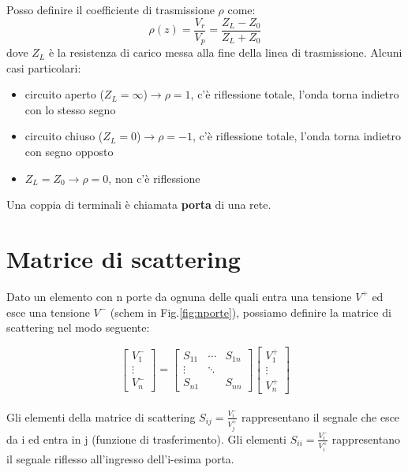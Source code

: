 \documentclass{article}
\begin{document}
Posso definire il coefficiente di trasmissione $\rho$ come:
\begin{equation*}
    \rho (z) = \frac{V_r}{V_p} = \frac{Z_L - Z_0}{Z_L + Z_0}
\end{equation*}
dove $Z_L$ è la resistenza di carico messa alla fine della linea di trasmissione.
Alcuni casi particolari:
\begin{itemize}
    \item circuito aperto ($Z_L = \infty$)$\rightarrow \rho = 1$, 
    c'è riflessione totale, l'onda torna indietro con lo stesso segno
    \item circuito chiuso ($Z_L = 0$)$\rightarrow \rho = -1$, 
    c'è riflessione totale, l'onda torna indietro con segno opposto
    \item $Z_L = Z_0 \rightarrow \rho = 0$, non c'è riflessione
\end{itemize}

Una coppia di terminali è chiamata \textbf{porta} di una rete.

\section{Matrice di scattering}
Dato un elemento con n porte da ognuna delle quali entra una tensione $V^+$ ed esce una tensione $V^-$
(schem in Fig.\ref{fig:nporte}), 
possiamo definire la matrice di scattering nel modo seguente:

\begin{equation*}
    \begin{bmatrix} 
        V^-_{1} \\
        \vdots \\
        V^-_{n}
    \end{bmatrix} 
    = 
    \begin{bmatrix} 
        S_{11} & \cdots & S_{1n} \\
        \vdots & \ddots & \\
        S_{n1} &        & S_{nn} 
    \end{bmatrix}
    \begin{bmatrix} 
        V^+_{1} \\
        \vdots \\
        V^+_{n}
    \end{bmatrix} 
\end{equation*}
\\
Gli elementi della matrice di scattering $S_{ij}=\frac{V^-_{i}}{V^+_{j}}$ rappresentano il segnale che esce da i ed entra in j (funzione di trasferimento).
Gli elementi $S_{ii}=\frac{V^-_{i}}{V^+_{i}}$ rappresentano il segnale riflesso all'ingresso dell'i-esima porta.
\end{document}
